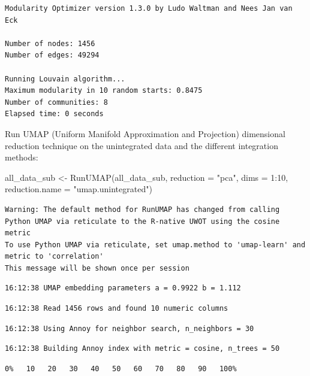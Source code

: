 \documentclass[
  letterpaper,
  DIV=11,
  numbers=noendperiod]{scrreprt}
\newenvironment{Shaded}{\begin{snugshade}}{\end{snugshade}}
\newcommand{\AttributeTok}[1]{\textcolor[rgb]{0.40,0.45,0.13}{#1}}
\newcommand{\DecValTok}[1]{\textcolor[rgb]{0.68,0.00,0.00}{#1}}
\newcommand{\FunctionTok}[1]{\textcolor[rgb]{0.28,0.35,0.67}{#1}}
\newcommand{\NormalTok}[1]{\textcolor[rgb]{0.00,0.23,0.31}{#1}}
\newcommand{\OtherTok}[1]{\textcolor[rgb]{0.00,0.23,0.31}{#1}}
\newcommand{\SpecialCharTok}[1]{\textcolor[rgb]{0.37,0.37,0.37}{#1}}
\newcommand{\StringTok}[1]{\textcolor[rgb]{0.13,0.47,0.30}{#1}}
\begin{document}
\begin{verbatim}
Modularity Optimizer version 1.3.0 by Ludo Waltman and Nees Jan van Eck

Number of nodes: 1456
Number of edges: 49294

Running Louvain algorithm...
Maximum modularity in 10 random starts: 0.8475
Number of communities: 8
Elapsed time: 0 seconds
\end{verbatim}

Run UMAP (Uniform Manifold Approximation and Projection) dimensional
reduction technique on the unintegrated data and the different
integration methods:

\begin{Shaded}
\begin{Highlighting}[]
\NormalTok{all\_data\_sub }\OtherTok{\textless{}{-}} \FunctionTok{RunUMAP}\NormalTok{(all\_data\_sub, }\AttributeTok{reduction =} \StringTok{"pca"}\NormalTok{, }\AttributeTok{dims =} \DecValTok{1}\SpecialCharTok{:}\DecValTok{10}\NormalTok{, }\AttributeTok{reduction.name =} \StringTok{"umap.unintegrated"}\NormalTok{)}
\end{Highlighting}
\end{Shaded}

\begin{verbatim}
Warning: The default method for RunUMAP has changed from calling Python UMAP via reticulate to the R-native UWOT using the cosine metric
To use Python UMAP via reticulate, set umap.method to 'umap-learn' and metric to 'correlation'
This message will be shown once per session
\end{verbatim}

\begin{verbatim}
16:12:38 UMAP embedding parameters a = 0.9922 b = 1.112
\end{verbatim}

\begin{verbatim}
16:12:38 Read 1456 rows and found 10 numeric columns
\end{verbatim}

\begin{verbatim}
16:12:38 Using Annoy for neighbor search, n_neighbors = 30
\end{verbatim}

\begin{verbatim}
16:12:38 Building Annoy index with metric = cosine, n_trees = 50
\end{verbatim}

\begin{verbatim}
0%   10   20   30   40   50   60   70   80   90   100%
\end{verbatim}
\end{document}
